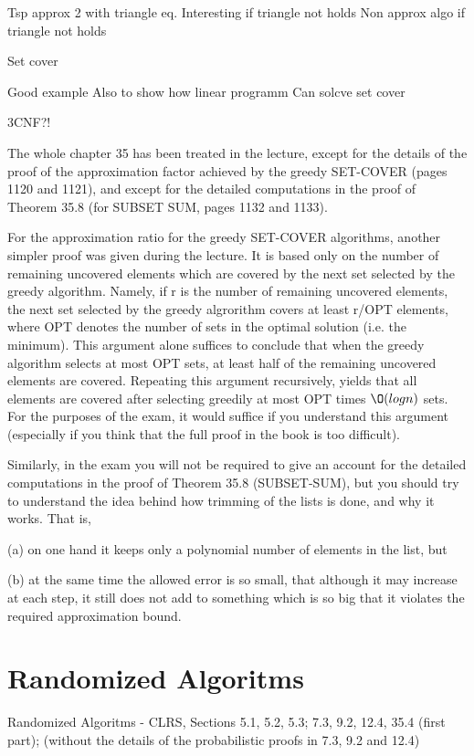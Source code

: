\documentclass[10pt]{article}
\begin{document}
Tsp approx 2 with triangle eq. Interesting if triangle not holds
Non approx algo if triangle not holds

Set cover

Good example Also to show how linear programm Can solcve set cover

3CNF?!               

The whole chapter 35 has been treated in the lecture, except for the details of the proof of the approximation factor achieved by the greedy SET-COVER (pages 1120 and 1121), and except for the detailed computations in the proof of Theorem 35.8 (for  SUBSET SUM, pages 1132 and 1133).

For the approximation ratio for the greedy SET-COVER algorithms, another simpler proof was given during the lecture. It is based only on the number of remaining uncovered elements which are covered by the next set  selected by the greedy algorithm. Namely, if r is the number of remaining uncovered elements, the next set selected by the greedy algrorithm covers at least r/OPT elements, where OPT denotes the number of sets in the optimal solution (i.e. the minimum). This argument alone suffices to conclude that when the greedy algorithm selects at most OPT sets,  at least half of the remaining uncovered elements are covered. Repeating this argument recursively, yields that all elements are covered after selecting greedily at most OPT times $\O(log n)$ sets. For the purposes of the exam, it would suffice if you understand this argument (especially if you think that the full proof in the book is too difficult).

Similarly, in the exam you will not be required to give an account for the detailed computations in the proof of Theorem 35.8 (SUBSET-SUM), but you should try to understand the idea behind how trimming of the lists is done, and why it works. That is,

(a) on one hand it keeps only a polynomial number of elements in the list, but

(b) at the same time the allowed error is so small, that although it may increase at each step, it still does not add to something which is so big that it violates the required approximation bound.


\section{Randomized Algoritms} %
\label{sec:randomized_algoritms}
Randomized Algoritms - CLRS, Sections  5.1, 5.2, 5.3; 7.3, 9.2, 12.4, 35.4 (first part); (without the details of the probabilistic proofs in 7.3, 9.2 and 12.4)                                                                                                                                                    
\end{document}
